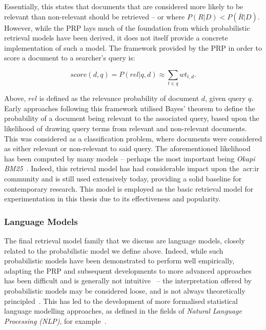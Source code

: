 Essentially, this states that documents that are considered more likely to be relevant than non-relevant should be retrieved -- or where $P(R|D) < P(\overline{R}|D)$. However, while the PRP lays much of the foundation from which probabilistic retrieval models have been derived, it does not itself provide a concrete implementation of such a model. The framework provided by the PRP in order to score a document to a searcher's query is:

\begin{equation*}
score(d,q) = P(rel|q,d) \approx \sum_{t \in q}wt_{t,d}.
\end{equation*}

Above, $rel$ is defined as the relevance probability of document $d$, given query $q$. Early approaches following this framework utilised Bayes' theorem to define the probability of a document being relevant to the associated query, based upon the likelihood of drawing query terms from relevant and non-relevant documents. This was considered as a classification problem, where documents were considered as either relevant or non-relevant to said query. The aforementioned likelihood has been computed by many models -- perhaps the most important being \emph{Okapi BM25}~\citep{robertson1995trec3}. Indeed, this retrieval model has had considerable impact upon the~\gls{acr:ir} community and is still used extensively today, providing a solid baseline for contemporary research. This model is employed as the basic retrieval model for experimentation in this thesis due to its effectiveness and popularity.

\subsubsection{Language Models}
The final retrieval model family that we discuss are language models, closely related to the probabilistic model we define above. Indeed, while such probabilistic models have been demonstrated to perform well empirically, adapting the PRP and subsequent developments to more advanced approaches has been difficult and is generally not intuitive~\citep{hiemstra2000language_modelling} -- the interpretation offered by probabilistic models may be considered loose, and is not always theoretically principled~\citep{whiting2015phd}. This has led to the development of more formalised statistical language modelling approaches, as defined in the fields of \emph{Natural Language Processing (NLP)}, for example~\citep{lavrenko2001language_models}.

